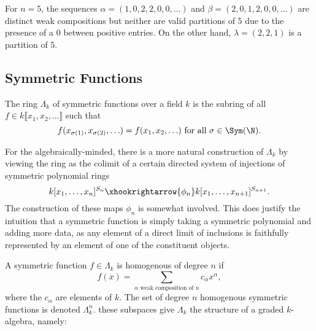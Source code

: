 \documentclass[12pt]{article}
\begin{document}
\begin{example}
  For $ n=5 $, the sequences $ \alpha=(1, 0, 2, 2, 0, 0, \ldots) $ and $ \beta=(2,0,1,2,0,0,\ldots) $ are distinct  weak compositions but neither are valid partitions of $ 5 $ due to the presence of a $ 0 $ between positive entries. On the other hand, $ \lambda = (2,2,1) $ is a partition of $ 5 $.
\end{example}

\subsection{Symmetric Functions}

\begin{definition}\label{def:symfunc}
    The ring $ \Lambda_{k} $ of symmetric functions over a field $ k $ is the subring of all $ f\in k\llbracket x_{1}, x_{2}, \ldots\rrbracket $ such that
    \[
      f(x_{\sigma(1)}, x_{\sigma(2)},\ldots) = f(x_{1},x_{2},\ldots) \text{ for all } \sigma\in \Sym(\N).
    \]
\end{definition}
\begin{remark}
    For the algebraically-minded, there is a more natural construction of $ \Lambda_{k} $ by viewing the ring as the colimit of a certain directed system of injections of symmetric polynomial rings
    \[
      k[x_{1},\ldots,x_{n}]^{S_{n}} \xhookrightarrow{\phi_{n}} k[x_{1},\ldots,x_{n+1}]^{S_{n+1}}.
    \]
    The construction of these maps $ \phi_{n} $ is somewhat involved. This does justify the intuition that a symmetric function is simply taking a symmetric polynomial and adding more data, as any element of a direct limit of inclusions is faithfully represented by an element of one of the constituent objects.

\end{remark}
\begin{definition}
    A symmetric function $ f\in \Lambda_{k} $ is homogenous of degree $ n $ if 
    \[
      f(x) = \sum_{\alpha\text{ weak composition of }n}c_{\alpha} x^{\alpha},
    \]
    where the $ c_{\alpha} $ are elements of $ k $. The set of degree $ n $ homogenous symmetric functions is denoted $ \Lambda_{k}^{n} $. these subspaces give $ \Lambda_{k} $ the structure of a graded $ k $-algebra, namely:
\end{definition}
\end{document}

